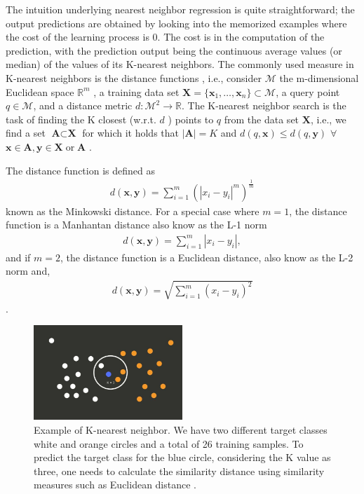 The intuition underlying nearest neighbor regression is quite straightforward;
the output predictions are obtained by looking into the memorized examples where the cost of the learning process is 0. The cost is in the computation of the prediction, with the prediction output being the continuous average values (or median) of the values of its K-nearest neighbors. The commonly used measure in K-nearest neighbors is the distance functions , i.e., consider $\mathcal{M}$ the m-dimensional Euclidean space $\mathbb{R}^m$  , a training data set $\textbf{X}=\{\textbf{x}_1,\dots, \textbf{x}_n\} \subset \mathcal{M}$, a query point $q\in \mathcal{M}$, and a distance metric $d:\mathcal{M}^2 \rightarrow \mathbb{R}$. The K-nearest neighbor search is the task of finding  the K closest (w.r.t. $d$ ) points to $q$ from the data set $\textbf{X}$, i.e., we find a set $\textbf{A} \subset \textbf{X}$ for which it holds  that $|\textbf{A}|= K$ and  $d(q,\textbf{x})\leq d(q,\textbf{y})$ $\forall$ $\textbf{x}\in \textbf{A}, \textbf{y}\in \textbf{X} \;\text{or}\; \textbf{A}$ \citep{hyvonen2015fast}. 

The distance function is defined as 
\begin{align}
d(\textbf{x},\textbf{y})= \sum_{i=1}^m \left(|x_i -y_i|^m\right)^{\frac{1}{m}}
\end{align}
known as the Minkowski distance. For a special case where $m=1$, the distance function is a Manhantan distance also know as the L-1 norm
\begin{align}
d(\textbf{x},\textbf{y})= \sum_{i=1}^m|x_i -y_i|,
\end{align}
and if $m=2$, the distance function is a Euclidean distance, also know as the L-2 norm and, 
\begin{align}
d(\textbf{x},\textbf{y})= \sqrt{\sum_{i=1}^m \left(x_i -y_i \right)^2}
\end{align}
\citep{cunningham2007k}.

\begin{figure}[H]
  \centering
    \includegraphics[width=0.5\textwidth]{images/Kn.jpg}
    \caption{Example of K-nearest neighbor. We have two different target classes white and orange circles and a total of 26 training samples. To predict the target class for the blue circle, considering the K value as three, one needs to calculate the similarity distance using similarity measures such as Euclidean distance \citep{K-NNALGORITHM}.}
  \label{kn}
\end{figure}

